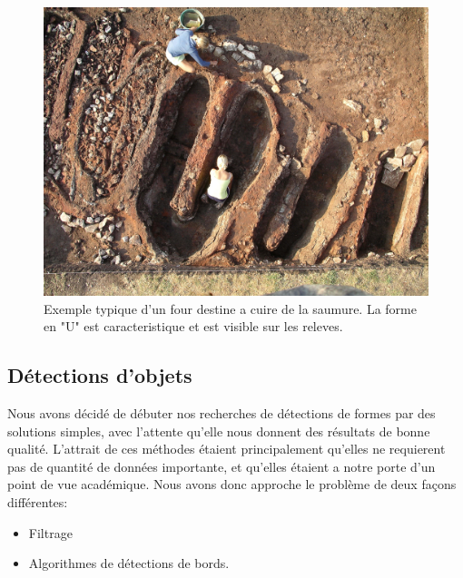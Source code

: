 \documentclass[a4paper, 12pt, titlepage, oneside, french]{article}
\begin{document}
\begin{figure}[H]
	\centering
		\includegraphics[width =\textwidth]{Four.jpg}
		\caption{Exemple typique d'un four destine a cuire de la saumure. La forme en "U" est caracteristique et est visible sur les releves.}
		\label{fig:ExempleFour}
\end{figure}

	\newpage
	\newpage
	\subsection{Détections d'objets}
	Nous avons décidé de débuter nos recherches de détections de formes par des solutions simples, avec l'attente qu'elle nous donnent des résultats de bonne qualité. L'attrait de ces méthodes étaient principalement qu'elles ne requierent pas de quantité de données importante, et qu'elles étaient a notre porte d'un point de vue académique. Nous avons donc approche le problème de deux façons différentes:
	\begin{itemize}
		\item Filtrage
		\item Algorithmes de détections de bords.
	\end{itemize}
\end{document}
